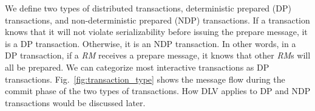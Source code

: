 \documentclass[conference]{IEEEtran}
\begin{document}
\begin{highlighted}
We define two types of distributed transactions,  deterministic prepared (DP) transactions, and non-deterministic prepared (NDP) transactions.
If a transaction knows that it will not violate serializability before issuing the prepare message, it is a DP transaction. Otherwise, it is an NDP transaction. 
In other words, in a DP transaction, if a \emph{RM} receives a prepare message, it knows that other \emph{RM}s will all be prepared.
We can categorize most interactive transactions as DP transactions.
Fig.~\ref{fig:transaction_type} shows the message flow during the commit phase of the two types of transactions.
How DLV applies to DP and NDP transactions would be discussed later.
\end{highlighted}
\end{document}
